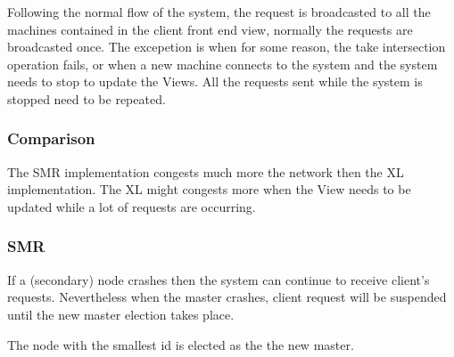 \documentclass[times, 10pt,twocolumn]{article}
\begin{document}

Following the normal flow of the system, the request is broadcasted to all the machines contained in the client front end view, normally the requests
are broadcasted once. The excepetion is when for some reason, the take intersection operation fails, or when a new machine connects to the system and 
the system needs to stop to update the Views. All the requests sent while the system is stopped need to be repeated.

\subsubsection{Comparison}


The SMR implementation congests much more the network then the XL implementation. The XL might congests more when the View needs to be updated while
a lot of requests are occurring.

\subsubsection{SMR}


If a (secondary) node crashes then the system can continue to receive client's requests. Nevertheless when the master crashes, client request will be
suspended until the new master election takes place.

The node with the smallest id is elected as the the new master.
\end{document}
